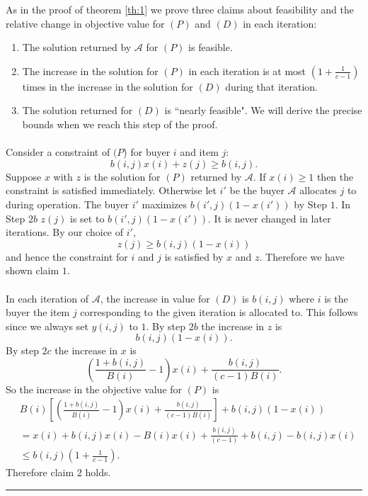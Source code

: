 \documentclass[letterpaper,12pt,oneside,onecolumn]{article}
\newcommand{\cA}{\mathcal{A}} \newcommand{\cB}{\mathcal{B}}
\newenvironment{proof}{{\bf Proof:  }}{\hfill\rule{2mm}{2mm}}
\begin{document}
\begin{proof}
As in the proof of theorem \ref{th:1} we prove three claims about feasibility and the relative change in objective value for $(P)$ and $(D)$ in each iteration:
\begin{enumerate}
\item The solution returned by $\cA$ for $(P)$ is feasible.
\item The increase in the solution for $(P)$ in each iteration is at most $(1+\frac{1}{c-1})$ times in the increase in the solution for $(D)$ during that iteration.
\item The solution returned for $(D)$ is ``nearly feasible". We will derive the precise bounds when we reach this step of the proof. 
\end{enumerate}
\paragraph{}
Consider a constraint of $(P$) for buyer $i$ and item $j$:
$$b(i,j)x(i) + z(j) \geq b(i,j).$$
Suppose $x$ with $z$ is the solution for $(P)$ returned by $\cA$. If $x(i) \geq 1$ then the constraint is satisfied immediately. Otherwise let $i'$ be the buyer $\cA$ allocates $j$ to during operation. The buyer $i'$ maximizes $b(i',j)(1-x(i'))$ by Step $1$. In Step $2b$ $z(j)$ is set to $b(i',j)(1-x(i')).$ It is never changed in later iterations. By our choice of $i'$, 
$$z(j) \geq b(i,j)(1-x(i))$$
and hence the constraint for $i$ and $j$ is satisfied by $x$ and $z$. Therefore we have shown claim $1$.
\paragraph{}
In each iteration of $\cA$, the increase in value for $(D)$ is $b(i,j)$ where $i$ is the buyer the item $j$ corresponding to the given iteration is allocated to. This follows since we always set $y(i,j)$ to $1$. By step $2b$ the increase in $z$ is 
$$b(i,j) (1-x(i)).$$
By step $2c$ the increase in $x$ is
$$(\frac{1+b(i,j)}{B(i)}-1)x(i) + \frac{b(i,j)}{(c-1)B(i)}.$$
So the increase in the objective value for $(P)$ is
\begin{align*}
&B(i)[(\frac{1+b(i,j)}{B(i)}-1)x(i) + \frac{b(i,j)}{(c-1)B(i)}] + b(i,j)(1-x(i)) \\&= x(i) +b(i,j)x(i) - B(i)x(i) +\frac{b(i,j)}{(c-1)} + b(i,j) -b(i,j)x(i)\\
&\leq b(i,j)(1+\frac{1}{c-1}).
\end{align*}
Therefore claim $2$ holds.

\end{proof}
\end{document}
